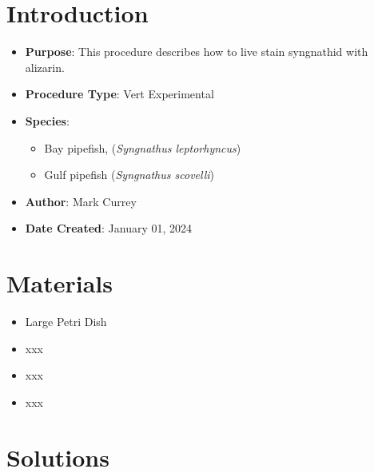 \documentclass[
  letterpaper,
  DIV=11,
  numbers=noendperiod]{scrreprt}
\providecommand{\tightlist}{%
  \setlength{\itemsep}{0pt}\setlength{\parskip}{0pt}}\usepackage{longtable,booktabs,array}
\begin{document}
\hypertarget{introduction-86}{%
\section{Introduction}\label{introduction-86}}

\begin{itemize}
\tightlist
\item
  \textbf{Purpose}: This procedure describes how to live stain
  syngnathid with alizarin.
\item
  \textbf{Procedure Type}: Vert Experimental
\item
  \textbf{Species}:

  \begin{itemize}
  \tightlist
  \item
    Bay pipefish, (\emph{Syngnathus leptorhyncus})
  \item
    Gulf pipefish (\emph{Syngnathus scovelli})
  \end{itemize}
\item
  \textbf{Author}: Mark Currey
\item
  \textbf{Date Created}: January 01, 2024
\end{itemize}

\hypertarget{materials-81}{%
\section{Materials}\label{materials-81}}

\begin{itemize}
\tightlist
\item
  Large Petri Dish
\item
  xxx
\item
  xxx
\item
  xxx
\end{itemize}

\hypertarget{solutions-73}{%
\section{Solutions}\label{solutions-73}}
\end{document}
